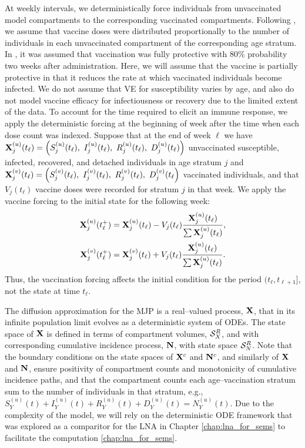 At weekly intervals, we deterministically force individuals from unvaccinated model compartments to the corresponding vaccinated compartments. Following \cite{shubin2016revealing}, we assume that vaccine doses were distributed proportionally to the number of individuals in each unvaccinated compartment of the corresponding age stratum. In \cite{shubin2016revealing}, it was assumed that vaccination was fully protective with 80\% probability two weeks after administration. Here, we will assume that the vaccine is partially protective in that it reduces the rate at which vaccinated individuals become infected. We do not assume that VE for susceptibility varies by age, and also do not model vaccine efficacy for infectiousness or recovery due to the limited extent of the data. To account for the time required to elicit an immune response, we apply the deterministic forcing at the beginning of week after the time when each dose count was indexed. Suppose that at the end of week $ \ell $ we have $ \bX_j^{(u)}(t_\ell) = \left (S_j^{(u)}(t_\ell),\ I_j^{(u)}(t_\ell),\ R_j^{(u)}(t_\ell),\ D_j^{(u)}(t_\ell)\right ) $ unvaccinated susceptible, infected, recovered, and detached individuals in age stratum $ j $ and $ \bX_j^{(v)}(t_\ell) = \left (S_j^{(v)}(t_\ell),\ I_j^{(v)}(t_\ell),\ R_j^{(v)}(t_\ell),\ D_j^{(v)}(t_\ell\right ) $ vaccinated individuals, and that $ V_j(t_\ell) $ vaccine doses were recorded for stratum $ j $ in that week. We apply the vaccine forcing to the initial state for the following week: 
\begin{align}
\label{eqn:vacc_forcing}
\begin{split}
	\mathbf{X}_{j}^{(u)}(t_\ell^+) &= \mathbf{X}_j^{(u)}(t_\ell) - V_j(t_\ell)\frac{\mathbf{X}_{j}^{(u)}(t_\ell)}{\sum\mathbf{X}_{j}^{(u)}(t_\ell)}, \\
	\mathbf{X}_{j}^{(v)}(t_\ell^+) &= \mathbf{X}_j^{(v)}(t_\ell) + V_j(t_\ell)\frac{\mathbf{X}_{j}^{(u)}(t_\ell)}{\sum\mathbf{X}_{j}^{(u)}(t_\ell)}.
\end{split}
\end{align}
Thus, the vaccination forcing affects the initial condition for the period $ (t_\ell,t_{\ell+1}] $, not the state at time $ t_\ell $. 

The diffusion approximation for the MJP is a real--valued process, $ \mathbf{X} $, that in its infinite population limit evolves as a deterministic system of ODEs. The state space of $ \mathbf{X} $ is defined in terms of compartment volumes, $ \mathcal{S}_X^R $, and with corresponding cumulative incidence process, $ \mathbf{N} $, with state space $ \mathcal{S}_N^R $. Note that the boundary conditions on the state spaces of $ \mathbf{X}^c $ and $ \mathbf{N}^c $, and similarly of $ \mathbf{X} $ and $ \mathbf{N} $, ensure positivity of compartment counts and monotonicity of cumulative incidence paths, and that the compartment counts each age--vaccination stratum sum to the number of individuals in that stratum, e.g., $ S_{Y}^{(u)}(t) + I_{Y}^{(u)}(t) + R_{Y}^{(u)}(t)+ D_{Y}^{(u)}(t) = N_{Y}^{(u)}(t) $. Due to the complexity of the model, we will rely on the deterministic ODE framework that was explored as a comparitor for the LNA in Chapter \ref{chap:lna_for_sems} to facilitate the computation \ref{chap:lna_for_sems}.  

